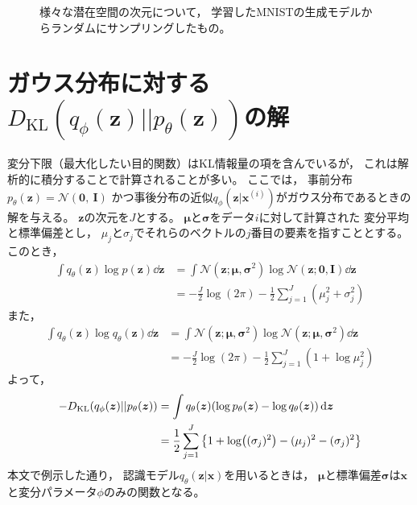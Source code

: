 \documentclass[dvipdfmx, fleqn, draft]{jsarticle}
\begin{document}
\begin{figure}[H]
\begin{minipage}{0.2\linewidth}
        \label{fig:latent_space_20D}
    \end{minipage}
    \caption{
        様々な潜在空間の次元について，
        学習したMNISTの生成モデルからランダムにサンプリングしたもの。
        }
    \label{fig:latent_spaces}
\end{figure}



\section{ガウス分布に対する\(D_\mathrm{KL}(q_{\phi}(\bm{z}) || p_{\theta} (\bm{z}))\)の解}

変分下限（最大化したい目的関数）はKL情報量の項を含んでいるが，
これは解析的に積分することで計算されることが多い。
ここでは，
事前分布\(p_{\theta} (\bm{z}) = \mathcal{N} (\bm{0},\ \bm{I})\)
かつ事後分布の近似\(q_{\phi} (\bm{z} | \bm{x}^{(i)})\)がガウス分布であるときの解を与える。
\(\bm{z}\)の次元を\(J\)とする。
\(\bm{\mu}\)と\(\bm{\sigma}\)をデータ\(i\)に対して計算された
変分平均と標準偏差とし，
\(\mu_j\)と\(\sigma_j\)でそれらのベクトルの\(j\)番目の要素を指すこととする。
このとき，
\begin{align*}
    \int q_{\theta} (\bm{z}) \log{p(\bm{z})} \dd{\bm{z}}
        & = \int \mathcal{N} (\bm{z}; \bm{\mu}, \bm{\sigma}^2) \log{\mathcal{N}(\bm{z}; \bm{0}, \bm{I})} \dd{\bm{z}} \\
        & = -\frac{J}{2} \log(2\pi) - \frac{1}{2} \sum_{j=1}^{J} (\mu_j^2 + \sigma_j^2)
\end{align*}
また，
\begin{align*}
    \int q_{\theta} (\bm{z}) \log{q_{\theta} (\bm{z})} \dd{\bm{z}}
        & = \int \mathcal{N} (\bm{z}; \bm{\mu}, \bm{\sigma}^2) \log{\mathcal{N}(\bm{z}; \bm{\mu}, \bm{\sigma}^2)} \dd{\bm{z}} \\
        & = -\frac{J}{2} \log(2\pi) - \frac{1}{2} \sum_{j=1}^{J} (1 + \log{\mu_j^2})
\end{align*}
よって，
\begin{align*}
    -D_\mathrm{KL}(q_{\phi}(\bm{z}) || p_{\theta} (\bm{z}))
        & = \int q_{\theta} (\bm{z}) \qty(\log{p_{\theta} (\bm{z}) - \log{q_{\theta} (\bm{z})}}) \dd{\bm{z}} \\
        & = \frac{1}{2} \sum_{j=1}^{J} \qty{1 + \log((\sigma_j)^2) - (\mu_j)^2 - (\sigma_j)^2}
\end{align*}
本文で例示した通り，
認識モデル\(q_{\theta} (\bm{z} | \bm{x})\)を用いるときは，
\(\bm{\mu}\)と標準偏差\(\bm{\sigma}\)は\(\bm{x}\)と変分パラメータ\(\phi\)のみの関数となる。
\end{document}
